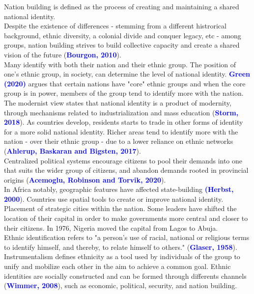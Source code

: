 \documentclass[11pt]{article}
\theoremstyle{plain}
\theoremstyle{plain}
\begin{document}
Nation building is defined as the process of creating and maintaining a shared national identity.\\
Despite the existence of differences - stemming from a different histrorical background, ethnic diversity, a colonial divide and conquer legacy, etc
- among groups, nation building strives to build collective capacity and create a shared vision of the future (\textcolor{blue}{\textbf{Bourgon, 2010}}).\\
Many identify with both their nation and their ethnic group. The position of one's ethnic group, in society, can determine the level of national identity.
\textcolor{blue}{\textbf{Green (2020)}} argues that certain nations have "core" ethnic groups and when the core group is in power, members of the group tend to identify more with the nation.\\

The modernist view states that national identity is a product of modernity, through mechanisms related to industrialization and mass education (\textcolor{blue}{\textbf{Storm, 2018}}).
As countries develop, residents starts to trade in other forms of identity for a more solid national identity. Richer areas tend to identify more with the nation - over their ethnic group - 
due to a lower reliance on ethnic networks (\textcolor{blue}{\textbf{Ahlerup, Baskaran and Bigsten, 2017}}).\\

Centralized political systems encourage citizens to pool their demands into one that suits the wider group of citizens, and abandon demands rooted in provincial origins (\textcolor{blue}{\textbf{Acemoglu, Robinson and Torvik, 2020}}).\\

In Africa notably, geographic features have affected state-building \textcolor{blue}{\textbf{(Herbst, 2000})}. Countries use spatial tools to create or improve national identity.\\
Placement of strategic cities within the nation. Some leaders have shifted the location of their capital in order to make governments more central and closer to their citizens. In 1976, Nigeria moved the capital from Lagos to Abuja.\\

Ethnic identification refers to "a person's use of racial, national or religious terms to identify himself, and thereby, to relate himself to others." (\textcolor{blue}{\textbf{Glaser, 1958}}).
Instrumentalism defines ethnicity as a tool used by individuals of the group to unify and mobilize each other in the aim to achieve a common goal.
Ethnic identities are socially constructed and can be formed through differents channels (\textcolor{blue}{\textbf{Wimmer, 2008}}), such as economic, political, security, and nation building.\\
\end{document}
